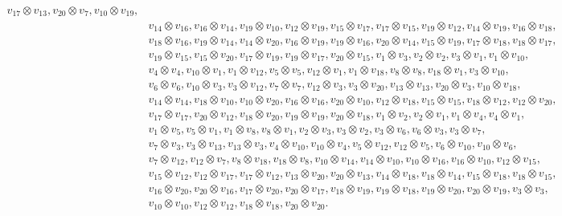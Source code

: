 \documentclass[pdftex]{sigma}
\numberwithin{equation}{section}
\theoremstyle{definition}
\begin{document}
\begin{align*}
v_{17} \otimes v_{13},
v_{20} \otimes v_{7},
v_{10} \otimes v_{19}, \\
&v_{14} \otimes v_{16},
v_{16} \otimes v_{14},
v_{19} \otimes v_{10},
v_{12} \otimes v_{19},
v_{15} \otimes v_{17},
v_{17} \otimes v_{15},
v_{19} \otimes v_{12},
v_{14} \otimes v_{19},
v_{16} \otimes v_{18}, \\
&v_{18} \otimes v_{16},
v_{19} \otimes v_{14},
v_{14} \otimes v_{20},
v_{16} \otimes v_{19},
v_{19} \otimes v_{16},
v_{20} \otimes v_{14},
v_{15} \otimes v_{19},
v_{17} \otimes v_{18},
v_{18} \otimes v_{17}, \\
&v_{19} \otimes v_{15},
v_{15} \otimes v_{20},
v_{17} \otimes v_{19},
v_{19} \otimes v_{17},
v_{20} \otimes v_{15},
v_{1} \otimes v_{3},
v_{2} \otimes v_{2},
v_{3} \otimes v_{1},
v_{1} \otimes v_{10}, \\
&v_{4} \otimes v_{4},
v_{10} \otimes v_{1},
v_{1} \otimes v_{12},
v_{5} \otimes v_{5},
v_{12} \otimes v_{1},
v_{1} \otimes v_{18},
v_{8} \otimes v_{8},
v_{18} \otimes v_{1},
v_{3} \otimes v_{10}, \\
&v_{6} \otimes v_{6},
v_{10} \otimes v_{3},
v_{3} \otimes v_{12},
v_{7} \otimes v_{7},
v_{12} \otimes v_{3},
v_{3} \otimes v_{20},
v_{13} \otimes v_{13},
v_{20} \otimes v_{3},
v_{10} \otimes v_{18}, \\
&v_{14} \otimes v_{14},
v_{18} \otimes v_{10},
v_{10} \otimes v_{20},
v_{16} \otimes v_{16},
v_{20} \otimes v_{10},
v_{12} \otimes v_{18},
v_{15} \otimes v_{15},
v_{18} \otimes v_{12},
v_{12} \otimes v_{20}, \\
&v_{17} \otimes v_{17},
v_{20} \otimes v_{12},
v_{18} \otimes v_{20},
v_{19} \otimes v_{19},
v_{20} \otimes v_{18},
v_{1} \otimes v_{2},
v_{2} \otimes v_{1},
v_{1} \otimes v_{4},
v_{4} \otimes v_{1}, \\
&v_{1} \otimes v_{5},
v_{5} \otimes v_{1},
v_{1} \otimes v_{8},
v_{8} \otimes v_{1},
v_{2} \otimes v_{3},
v_{3} \otimes v_{2},
v_{3} \otimes v_{6},
v_{6} \otimes v_{3},
v_{3} \otimes v_{7}, \\
&v_{7} \otimes v_{3},
v_{3} \otimes v_{13},
v_{13} \otimes v_{3},
v_{4} \otimes v_{10},
v_{10} \otimes v_{4},
v_{5} \otimes v_{12},
v_{12} \otimes v_{5},
v_{6} \otimes v_{10},
v_{10} \otimes v_{6}, \\
&v_{7} \otimes v_{12},
v_{12} \otimes v_{7},
v_{8} \otimes v_{18},
v_{18} \otimes v_{8},
v_{10} \otimes v_{14},
v_{14} \otimes v_{10},
v_{10} \otimes v_{16},
v_{16} \otimes v_{10},
v_{12} \otimes v_{15}, \\
&v_{15} \otimes v_{12},
v_{12} \otimes v_{17},
v_{17} \otimes v_{12},
v_{13} \otimes v_{20},
v_{20} \otimes v_{13},
v_{14} \otimes v_{18},
v_{18} \otimes v_{14},
v_{15} \otimes v_{18},
v_{18} \otimes v_{15}, \\
&v_{16} \otimes v_{20},
v_{20} \otimes v_{16},
v_{17} \otimes v_{20},
v_{20} \otimes v_{17},
v_{18} \otimes v_{19},
v_{19} \otimes v_{18},
v_{19} \otimes v_{20},
v_{20} \otimes v_{19},
v_{3} \otimes v_{3}, \\
&v_{10} \otimes v_{10},
v_{12} \otimes v_{12},
v_{18} \otimes v_{18},
v_{20} \otimes v_{20}.
\end{align*}
\end{document}
